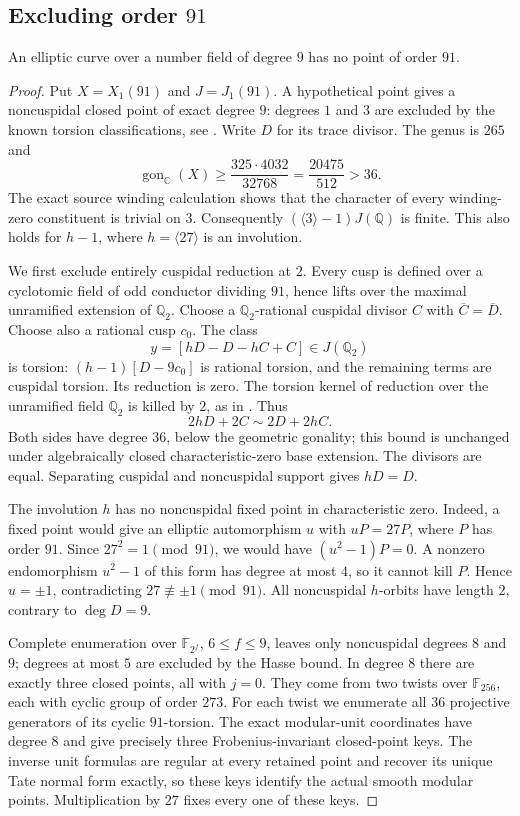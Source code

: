 \subsection{Excluding order $91$}
\begin{proposition}\label{prop:nonic91-exclusion}
An elliptic curve over a number field of degree $9$ has no point of order $91$.
\end{proposition}
\begin{proof}
Put $X=X_1(91)$ and $J=J_1(91)$. A hypothetical point gives a noncuspidal closed point of exact degree $9$: degrees $1$ and $3$ are excluded by the known torsion classifications, see \cite{DEHMZ}. Write $D$ for its trace divisor. The genus is $265$ and
\[
 \operatorname{gon}_{\mathbb C}(X)\geq\frac{325\cdot4032}{32768}
 =\frac{20475}{512}>36.
\]
The exact source winding calculation shows that the character of every winding-zero constituent is trivial on $3$. Consequently $(\langle3\rangle-1)J(\mathbb Q)$ is finite. This also holds for $h-1$, where $h=\langle27\rangle$ is an involution.

We first exclude entirely cuspidal reduction at $2$. Every cusp is defined over a cyclotomic field of odd conductor dividing $91$, hence lifts over the maximal unramified extension of $\mathbb Q_2$. Choose a $\mathbb Q_2$-rational cuspidal divisor $C$ with $\overline C=\overline D$. Choose also a rational cusp $c_0$. The class
\[
 y=[hD-D-hC+C]\in J(\mathbb Q_2)
\]
is torsion: $(h-1)[D-9c_0]$ is rational torsion, and the remaining terms are cuspidal torsion. Its reduction is zero. The torsion kernel of reduction over the unramified field $\mathbb Q_2$ is killed by $2$, as in \cite[proof of Proposition~3.4]{DKSS}. Thus
\[
 2hD+2C\sim2D+2hC.
\]
Both sides have degree $36$, below the geometric gonality; this bound is unchanged under algebraically closed characteristic-zero base extension. The divisors are equal. Separating cuspidal and noncuspidal support gives $hD=D$.

The involution $h$ has no noncuspidal fixed point in characteristic zero. Indeed, a fixed point would give an elliptic automorphism $u$ with $uP=27P$, where $P$ has order $91$. Since $27^2=1\pmod {91}$, we would have $(u^2-1)P=0$. A nonzero endomorphism $u^2-1$ of this form has degree at most $4$, so it cannot kill $P$. Hence $u=\pm1$, contradicting $27\not\equiv\pm1\pmod {91}$. All noncuspidal $h$-orbits have length $2$, contrary to $\deg D=9$.

Complete enumeration over $\mathbb F_{2^f}$, $6\leq f\leq9$, leaves only noncuspidal degrees $8$ and $9$; degrees at most $5$ are excluded by the Hasse bound. In degree $8$ there are exactly three closed points, all with $j=0$. They come from two twists over $\mathbb F_{256}$, each with cyclic group of order $273$. For each twist we enumerate all $36$ projective generators of its cyclic $91$-torsion. The exact modular-unit coordinates have degree $8$ and give precisely three Frobenius-invariant closed-point keys. The inverse unit formulas are regular at every retained point and recover its unique Tate normal form exactly, so these keys identify the actual smooth modular points. Multiplication by $27$ fixes every one of these keys.


\end{proof}
